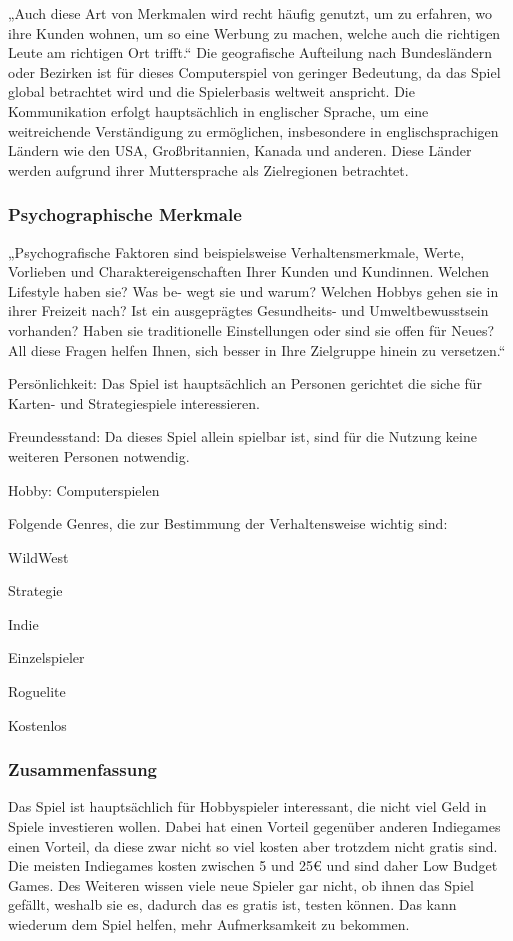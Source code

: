 „Auch diese Art von Merkmalen wird recht häufig genutzt, um zu erfahren, wo ihre Kunden wohnen, um so eine Werbung zu machen, welche auch die richtigen Leute am richtigen Ort trifft.“
Die geografische Aufteilung nach Bundesländern oder Bezirken ist für dieses Computerspiel von geringer Bedeutung, da das Spiel global betrachtet wird und die Spielerbasis weltweit anspricht.
Die Kommunikation erfolgt hauptsächlich in englischer Sprache, um eine weitreichende Verständigung zu ermöglichen, insbesondere in englischsprachigen Ländern wie den USA, Großbritannien, Kanada und anderen.
Diese Länder werden aufgrund ihrer Muttersprache als Zielregionen betrachtet.

\subsubsection{Psychographische Merkmale}\label{subsubsec:Psychographische-Merkmale}

„Psychografische Faktoren sind beispielsweise Verhaltensmerkmale, Werte, Vorlieben und Charaktereigenschaften Ihrer Kunden und Kundinnen. Welchen Lifestyle haben sie? Was be-
wegt sie und warum? Welchen Hobbys gehen sie in ihrer Freizeit nach? Ist ein ausgeprägtes Gesundheits- und Umweltbewusstsein vorhanden? Haben sie traditionelle Einstellungen oder
sind sie offen für Neues? All diese Fragen helfen Ihnen, sich besser in Ihre Zielgruppe hinein zu versetzen.“ 

Persönlichkeit: Das Spiel ist hauptsächlich an Personen gerichtet die siche für Karten- und Strategiespiele interessieren.

Freundesstand: Da dieses Spiel allein spielbar ist, sind für die Nutzung keine weiteren Personen notwendig.

Hobby: Computerspielen

Folgende Genres, die zur Bestimmung der Verhaltensweise wichtig sind:
\begin{liste}
    \item WildWest
    \item Strategie
    \item Indie
    \item Einzelspieler
    \item Roguelite
    \item Kostenlos
\end{liste}


\subsubsection{Zusammenfassung}\label{subsubsec:Zusammenfassung}
Das Spiel ist hauptsächlich für Hobbyspieler interessant, die nicht viel Geld in Spiele investieren wollen. Dabei hat \ff einen Vorteil gegenüber anderen Indiegames einen Vorteil,
da diese zwar nicht so viel kosten aber trotzdem nicht gratis sind. Die meisten Indiegames kosten zwischen 5 und 25€ und sind daher Low Budget Games.\cite[.vgl]{IndiegamesPreis}
Des Weiteren wissen viele neue Spieler gar nicht, ob ihnen das Spiel gefällt, weshalb sie es, dadurch das es gratis ist, testen können. Das
kann wiederum dem Spiel helfen, mehr Aufmerksamkeit zu bekommen.


\renewcommand{\kapitelautor}{}
